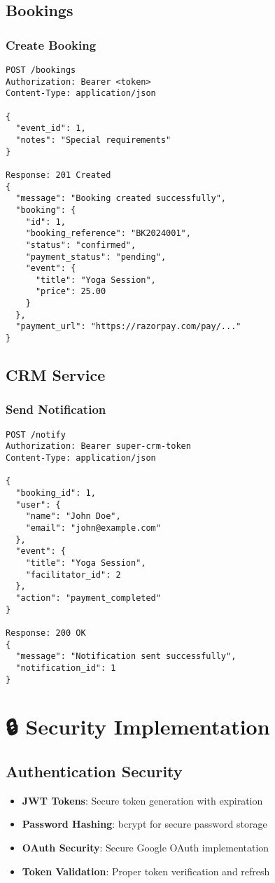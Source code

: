 \documentclass[12pt,a4paper]{article}
\begin{document}
\subsection{Bookings}

\subsubsection{Create Booking}
\begin{lstlisting}[language=HTTP]
POST /bookings
Authorization: Bearer <token>
Content-Type: application/json

{
  "event_id": 1,
  "notes": "Special requirements"
}

Response: 201 Created
{
  "message": "Booking created successfully",
  "booking": {
    "id": 1,
    "booking_reference": "BK2024001",
    "status": "confirmed",
    "payment_status": "pending",
    "event": {
      "title": "Yoga Session",
      "price": 25.00
    }
  },
  "payment_url": "https://razorpay.com/pay/..."
}
\end{lstlisting}

\subsection{CRM Service}

\subsubsection{Send Notification}
\begin{lstlisting}[language=HTTP]
POST /notify
Authorization: Bearer super-crm-token
Content-Type: application/json

{
  "booking_id": 1,
  "user": {
    "name": "John Doe",
    "email": "john@example.com"
  },
  "event": {
    "title": "Yoga Session",
    "facilitator_id": 2
  },
  "action": "payment_completed"
}

Response: 200 OK
{
  "message": "Notification sent successfully",
  "notification_id": 1
}
\end{lstlisting}

\section{🔒 Security Implementation}

\subsection{Authentication Security}
\begin{itemize}
    \item \textbf{JWT Tokens}: Secure token generation with expiration
    \item \textbf{Password Hashing}: bcrypt for secure password storage
    \item \textbf{OAuth Security}: Secure Google OAuth implementation
    \item \textbf{Token Validation}: Proper token verification and refresh
\end{itemize}
\end{document}
